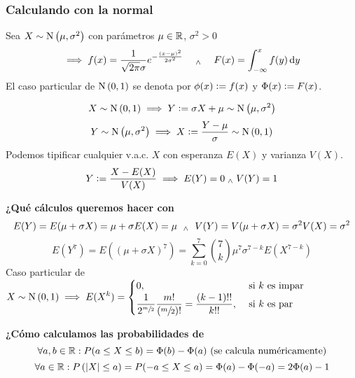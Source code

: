 \subsubsection{Calculando con la normal }
Sea $X\sim\operatorname{N}\left(\mu, \sigma^2\right)$ con parámetros $\mu\in\mathbb{R}$, $\sigma^2>0$\
\[\implies f(x) = \frac{1}{\sqrt{2\pi}\sigma} e^{-\frac{(x-\mu)^2}{2\sigma^2}} \quad \we \quad F(x) = \int_{-\infty}^{x} f(y) \odif{y}\]
El caso particular de $\operatorname{N}\left(0, 1\right)$ se denota por $\phi(x) \vcentcolon= f(x)$ y $\Phi(x)\vcentcolon= F(x)$.
\begin{center}
\end{center}

\[X\sim\operatorname{N}\left(0, 1\right) \implies Y\vcentcolon=\sigma X + \mu \sim \operatorname{N}\left(\mu, \sigma^2\right)\]
\[Y\sim\operatorname{N}\left(\mu, \sigma^2\right) \implies X\vcentcolon= \frac{Y-\mu}{\sigma} \sim \operatorname{N}\left(0, 1\right)\]
Podemos tipificar cualquier v.a.c. $X$ con esperanza $E(X)$ y varianza $V(X)$.
\[Y\vcentcolon= \frac{X-E(X)}{V(X)} \implies E(Y) = 0 \; _{\wedge} \; V(Y) = 1\]

\textbf{¿Qué cálculos queremos hacer con }
\[E(Y) = E(\mu + \sigma X) = \mu + \sigma E(X) = \mu\, \,\; _{\wedge} \;\, \, V(Y) = V(\mu + \sigma X) = \sigma^2 V(X) = \sigma^2\]
\[E\left(Y^7\right) = E\left(\left(\mu + \sigma X\right)^7\right) = \sum_{k=0}^7 \binom{7}{k} \mu^7 \sigma^{7-k} E(X^{7-k})\]
Caso particular de $X\sim \operatorname{N}\left(0,1\right) \implies \displaystyle E(X^k) = \begin{cases}
		0,                                                                                          & \text{ si } k \text{ es impar} \\
		\displaystyle \frac{1}{2^{\sfrac{m}{2}}} \frac{m!}{\left(\sfrac{m}{2}\right)!} = \frac{(k-1)!!}{k!!}, & \text{ si } k \text{ es par}
	\end{cases}$

\textbf{¿Cómo calculamos las probabilidades de }
\[\forall a, b \in \mathbb{R} : P(a\leq X \leq b) = \Phi(b) - \Phi(a) \text{ (se calcula numéricamente)}\]
\[\forall a \in \mathbb{R} : P\left(\left|X\right| \leq a\right) = P(-a \leq X\leq a) = \Phi(a) - \Phi(-a) = 2\Phi(a) - 1\]

